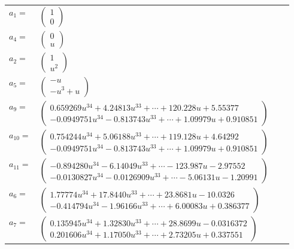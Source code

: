 \documentclass[1p]{elsarticle_modified}
\theoremstyle{definition}
\begin{document}
\begin{tabular}{m{7pt} m{180pt} m{7pt} m{180pt} }
\flushright $a_{1}=$&$\begin{pmatrix}1\\0\end{pmatrix}$ \\
\flushright $a_{4}=$&$\begin{pmatrix}0\\u\end{pmatrix}$ \\
\flushright $a_{2}=$&$\begin{pmatrix}1\\u^2\end{pmatrix}$ \\
\flushright $a_{5}=$&$\begin{pmatrix}- u\\- u^3+u\end{pmatrix}$ \\
\flushright $a_{9}=$&$\begin{pmatrix}0.659269 u^{34}+4.24813 u^{33}+\cdots+120.228 u+5.55377\\-0.0949751 u^{34}-0.813743 u^{33}+\cdots+1.09979 u+0.910851\end{pmatrix}$ \\
\flushright $a_{10}=$&$\begin{pmatrix}0.754244 u^{34}+5.06188 u^{33}+\cdots+119.128 u+4.64292\\-0.0949751 u^{34}-0.813743 u^{33}+\cdots+1.09979 u+0.910851\end{pmatrix}$ \\
\flushright $a_{11}=$&$\begin{pmatrix}-0.894280 u^{34}-6.14049 u^{33}+\cdots-123.987 u-2.97552\\-0.0130827 u^{34}-0.0126909 u^{33}+\cdots-5.06131 u-1.20991\end{pmatrix}$ \\
\flushright $a_{6}=$&$\begin{pmatrix}1.77774 u^{34}+17.8440 u^{33}+\cdots+23.8681 u-10.0326\\-0.414794 u^{34}-1.96166 u^{33}+\cdots+6.00083 u+0.386377\end{pmatrix}$ \\
\flushright $a_{7}=$&$\begin{pmatrix}0.135945 u^{34}+1.32830 u^{33}+\cdots+28.8699 u-0.0316372\\0.201606 u^{34}+1.17050 u^{33}+\cdots+2.73205 u+0.337551\end{pmatrix}$ \\

\end{tabular}
\end{document}
